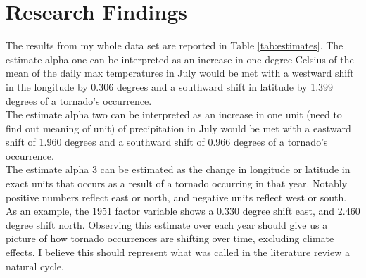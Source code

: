 \documentclass[12pt,english]{article}
\begin{document}
\section{Research Findings}\label{sec:results}
The results from my whole data set are reported in Table \ref{tab:estimates}.
The estimate alpha one can be interpreted as an increase in one degree Celsius of the mean of the daily max temperatures in July would be met with a westward shift in the longitude by 0.306 degrees and a southward shift in latitude by 1.399 degrees of a tornado's occurrence.\\
The estimate alpha two can be interpreted as an increase in one unit (need to find out meaning of unit) of precipitation in July would be met with a eastward shift of 1.960 degrees and a southward shift of 0.966 degrees of a tornado's occurrence.\\
The estimate alpha 3 can be estimated as the change in longitude or latitude in exact units that occurs as a result of a tornado occurring in that year. Notably positive numbers reflect east or north, and negative units reflect west or south. As an example, the 1951 factor variable shows a 0.330 degree shift east, and 2.460 degree shift north. Observing this estimate over each year should give us a picture of how tornado occurrences are shifting over time, excluding climate effects. I believe this should represent what was called in the literature review a natural cycle.\\
\end{document}
